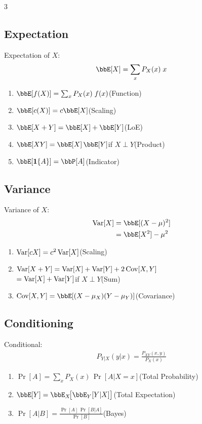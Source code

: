 \documentclass[12pt, a4paper]{article}
\begin{document}
\begin{multicols*}{3}
\subsection{Expectation}
Expectation of $X$:
\begin{align*}
  \E[X] = \sum_x P_X(x)\;x
\end{align*}
\begin{enumerate}[\roman*.]
  \item $\E[f(X)] = \sum_x P_X(x)\;f(x)$\hfill(Function)
  \item $\E[c(X)] = c\E[X]$\hfill(Scaling)
  \item $\E[X+Y] = \E[X] + \E[Y]$\hfill(LoE)
  \item $\E[XY] = \E[X]\,\E[Y]$\quad if $X\perp Y$\hfill(Product)
  \item $\E[\1{A}] = \Pr[A]$\hfill(Indicator)
\end{enumerate}

\subsection{Variance}
Variance of $X$:
\begin{align*}
  \Var[X] &= \E[(X-\mu)^2]\\ 
          &= \E[X^2]-\mu^2
\end{align*}
\begin{enumerate}[\roman*.]
  \item $\operatorname{Var}[cX] = c^2\operatorname{Var}[X]$\hfill(Scaling)
  \item $\operatorname{Var}[X+Y] = \operatorname{Var}[X] + \operatorname{Var}[Y] + 2\operatorname{Cov}[X,Y]$\\
    \hspace{5.3em}$=\operatorname{Var}[X] + \operatorname{Var}[Y]$\quad if $X\perp Y$\hfill(Sum)
  \item $\Cov[X,Y] = \E[(X-\mu_X)(Y-\mu_Y)]$\hfill(Covariance)
\end{enumerate}

\colbreak
\subsection{Conditioning}
Conditional:
\begin{align*}
  P_{Y|X}(y|x) = \frac{P_{XY}(x,y)}{P_X(x)}
\end{align*}
\begin{enumerate}[\roman*.]
  \item $\Pr[A] = \sum_x P_X(x)\,\Pr[A|X=x]$\hfill(Total Probability)
  \item $\E[Y] = \E_X\!\big[\E_Y[Y|X]\big]$\hfill(Total Expectation)
  \item $\Pr[A|B] = \frac{\Pr[A]\,\Pr[B|A]}{\Pr[B]}$\hfill(Bayes)
\end{enumerate}


\end{multicols*}
\end{document}
